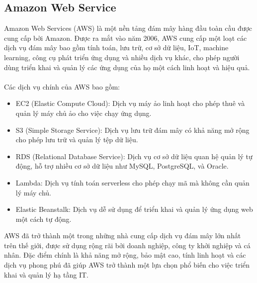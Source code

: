 \subsection{Amazon Web Service}
Amazon Web Services (AWS) là một nền tảng đám mây hàng đầu toàn cầu được cung cấp bởi Amazon. Được ra mắt vào năm 2006, AWS cung cấp một loạt các dịch vụ đám mây bao gồm tính toán, lưu trữ, cơ sở dữ liệu, IoT, machine learning, công cụ phát triển ứng dụng và nhiều dịch vụ khác, cho phép người dùng triển khai và quản lý các ứng dụng của họ một cách linh hoạt và hiệu quả.\\
\\
Các dịch vụ chính của AWS bao gồm:
\begin{itemize}
    \item EC2 (Elastic Compute Cloud): Dịch vụ máy ảo linh hoạt cho phép thuê và quản lý máy chủ ảo cho việc chạy ứng dụng.

    \item S3 (Simple Storage Service): Dịch vụ lưu trữ đám mây có khả năng mở rộng cho phép lưu trữ và quản lý tệp dữ liệu.

    \item RDS (Relational Database Service): Dịch vụ cơ sở dữ liệu quan hệ quản lý tự động, hỗ trợ nhiều cơ sở dữ liệu như MySQL, PostgreSQL, và Oracle.

    \item Lambda: Dịch vụ tính toán serverless cho phép chạy mã mà không cần quản lý máy chủ.

    \item Elastic Beanstalk: Dịch vụ dễ sử dụng để triển khai và quản lý ứng dụng web một cách tự động.
\end{itemize}
AWS đã trở thành một trong những nhà cung cấp dịch vụ đám mây lớn nhất trên thế giới, được sử dụng rộng rãi bởi doanh nghiệp, công ty khởi nghiệp và cá nhân. Đặc điểm chính là khả năng mở rộng, bảo mật cao, tính linh hoạt và các dịch vụ phong phú đã giúp AWS trở thành một lựa chọn phổ biến cho việc triển khai và quản lý hạ tầng IT.